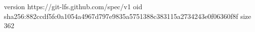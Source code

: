 version https://git-lfs.github.com/spec/v1
oid sha256:882ccdf5fc0a1054a4967d797e9835a5751388c383115a2734243e0f06360f8f
size 362
